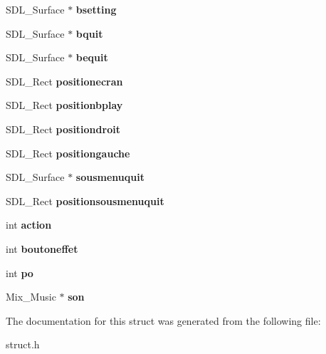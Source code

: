 \begin{DoxyCompactItemize}
S\+D\+L\+\_\+\+Surface $\ast$ {\bfseries bsetting}
\item 
\mbox{\label{structmenu_a08536c2303a8774b6f14bb48d2fd8a38}} 
S\+D\+L\+\_\+\+Surface $\ast$ {\bfseries bquit}
\item 
\mbox{\label{structmenu_a0273161cfcb4913b3730a2098bc9b61d}} 
S\+D\+L\+\_\+\+Surface $\ast$ {\bfseries bequit}
\item 
\mbox{\label{structmenu_addc595955e50e4d76ea81e30adbf1a00}} 
S\+D\+L\+\_\+\+Rect {\bfseries positionecran}
\item 
\mbox{\label{structmenu_a3ed8c92dbf426da82943a9b83b5bebd5}} 
S\+D\+L\+\_\+\+Rect {\bfseries positionbplay}
\item 
\mbox{\label{structmenu_afe9e96e10bfef62ed729af4e950e96e0}} 
S\+D\+L\+\_\+\+Rect {\bfseries positiondroit}
\item 
\mbox{\label{structmenu_a7bf3f5b262dff12ce28ac1db69bc5a22}} 
S\+D\+L\+\_\+\+Rect {\bfseries positiongauche}
\item 
\mbox{\label{structmenu_a9239f5f47587eafebaacab2d03696308}} 
S\+D\+L\+\_\+\+Surface $\ast$ {\bfseries sousmenuquit}
\item 
\mbox{\label{structmenu_abb4ed1db4bda8b600267aefbaab1be68}} 
S\+D\+L\+\_\+\+Rect {\bfseries positionsousmenuquit}
\item 
\mbox{\label{structmenu_adc5b170275d8df6e6663eeab81097be5}} 
int {\bfseries action}
\item 
\mbox{\label{structmenu_af7f753e6bbf9f58213e9d2007a59e0cf}} 
int {\bfseries boutoneffet}
\item 
\mbox{\label{structmenu_a106b1051a6c9a136cc7d04d4ee0538e3}} 
int {\bfseries po}
\item 
\mbox{\label{structmenu_a5b4aabde6699af1ef12391dfeb6389d6}} 
Mix\+\_\+\+Music $\ast$ {\bfseries son}
\end{DoxyCompactItemize}


The documentation for this struct was generated from the following file\+:\begin{DoxyCompactItemize}
\item 
struct.\+h\end{DoxyCompactItemize}
